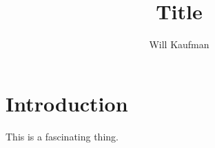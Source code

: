 \documentclass{turabian-researchpaper}
\begin{document}
\title{Title}
\author{Will Kaufman}
\maketitle

\section{Introduction}
This is a fascinating thing.
\end{document}
